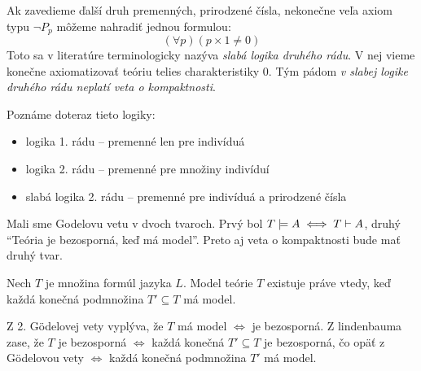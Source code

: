 \begin{poznamka}
    Ak zavedieme ďalší druh premenných, prirodzené čísla,
    nekonečne veľa axiom typu $\neg P_p$ môžeme nahradiť jednou formulou:
    \begin{equation*}
        (\forall p)(p\times 1\not=0)
    \end{equation*}
    Toto sa v literatúre terminologicky nazýva
    \emph{slabá logika druhého rádu}. V nej
    vieme konečne axiomatizovať teóriu telies charakteristiky 0.
    Tým pádom 
    \emph{v slabej logike druhého rádu neplatí veta o kompaktnosti}.
\end{poznamka}

\begin{poznamka}
    Poznáme doteraz tieto logiky:
    \begin{itemize}
    \item logika 1. rádu -- premenné len pre indivíduá
    \item logika 2. rádu -- premenné pre množiny indivíduí
    \item slabá logika 2. rádu -- premenné pre indivíduá a prirodzené
        čísla
    \end{itemize}
\end{poznamka}

\medskip \noindent
Mali sme Godelovu vetu v dvoch tvaroch. Prvý bol
$ T \models A \iff T \vdash A$, druhý ``Teória je bezosporná, keď
má model''. Preto aj veta o kompaktnosti bude mať druhý tvar.

\begin{veta}
    Nech $T$ je množina formúl jazyka $L$. 
    Model teórie $T$ existuje práve vtedy, keď každá konečná podmnožina
    $T' \subseteq T$ má model.
\end{veta}

\begin{dokaz}
    Z 2. G\"odelovej vety vyplýva, že $T$ má model $\iff$ je bezosporná.
    Z lindenbauma zase, že $T$ je bezosporná $\iff$ každá konečná
    $T' \subseteq T$ je bezosporná, čo opäť z G\"odelovou vety
    $\iff$ každá konečná podmnožina $T'$ má model.
\end{dokaz}

